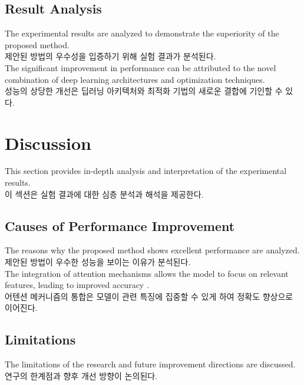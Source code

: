 \documentclass[preprint,12pt]{elsarticle}
\begin{document}
\subsection{Result Analysis}
The experimental results are analyzed to demonstrate the superiority of the proposed method. \\
제안된 방법의 우수성을 입증하기 위해 실험 결과가 분석된다. \\

The significant improvement in performance can be attributed to the novel combination of deep learning architectures and optimization techniques. \\
성능의 상당한 개선은 딥러닝 아키텍처와 최적화 기법의 새로운 결합에 기인할 수 있다. \\

\section{Discussion}
\label{sec:discussion}

This section provides in-depth analysis and interpretation of the experimental results. \\
이 섹션은 실험 결과에 대한 심층 분석과 해석을 제공한다. \\

\subsection{Causes of Performance Improvement}
The reasons why the proposed method shows excellent performance are analyzed. \\
제안된 방법이 우수한 성능을 보이는 이유가 분석된다. \\

The integration of attention mechanisms allows the model to focus on relevant features, leading to improved accuracy \cite{bahdanau2014neural}. \\
어텐션 메커니즘의 통합은 모델이 관련 특징에 집중할 수 있게 하여 정확도 향상으로 이어진다. \\

\subsection{Limitations}
The limitations of the research and future improvement directions are discussed. \\
연구의 한계점과 향후 개선 방향이 논의된다. \\
\end{document}
